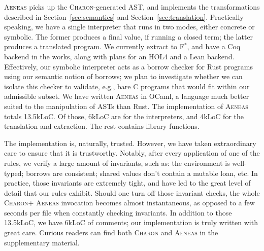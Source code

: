 \documentclass[acmsmall,screen]{acmart}
\newcommand{\sref}[1]{Section~\ref{sec:#1}}
\newcommand{\aeneas}{\textsc{Aeneas}\xspace}
\newcommand{\charon}{\textsc{Charon}\xspace}
\newcommand{\fstar}{F$^\ast$\xspace}
\begin{document}
\aeneas picks up the \charon-generated AST, and implements the transformations
described in \sref{semantics} and \sref{translation}. Practically speaking, we
have a single interpreter that runs in two modes, either concrete or symbolic.
The former produces a final value, if running a closed term; the latter produces
a translated program. We currently extract to \fstar, and have a Coq backend in
the works, along with plans for an HOL4 and a Lean backend.
Effectively, our symbolic interpreter acts as a borrow checker for Rust programs
using our semantic notion of borrows; we plan to investigate whether we can
isolate this checker to validate, e.g., bare C programs that would fit within
our admissible subset. We have written \aeneas in OCaml, a language much better
suited to the manipulation of ASTs than Rust. The implementation of \aeneas
totals 13.5kLoC.  Of those, 6kLoC are for the interpreters, and 4kLoC for the
translation and extraction. The rest contains library functions.

The implementation is, naturally, trusted. However, we have taken extraordinary care
to ensure that it is trustworthy. Notably, after every application of one of the
rules, we verify a large amount of invariants, such as: the environment is
well-typed; borrows are consistent; shared values don't contain a mutable loan,
etc. In practice, those invariants are extremely tight, and have led to the
great level of detail that our rules exhibit.
Should one turn off those invariant checks, the whole \charon + \aeneas invocation becomes almost
instantaneous, as opposed to a few seconds per file when constantly checking invariants.
In addition to those 13.5kLoC, we
have 6kLoC of comments; our implementation is truly written with great care.
Curious readers can find both \charon and \aeneas in the supplementary material.
\end{document}
